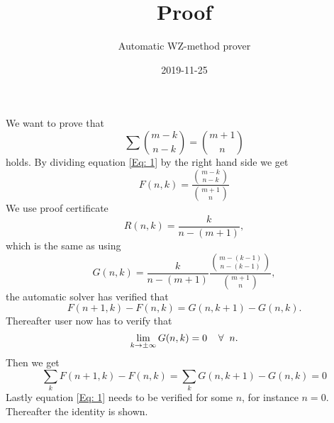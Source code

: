 \documentclass{article}
\title{Proof}
\author{Automatic WZ-method prover}
\date{2019-11-25}
\let\oldforall\forall
\renewcommand{\forall}{\hspace*{2mm}\oldforall\hspace*{1mm}}
\begin{document}
\maketitle
We want to prove that
\begin{equation}\label{Eq: 1}
\sum \binom{m-k}{n-k} = \binom{m+1}{n}
\end{equation}
holds. By dividing equation \ref{Eq: 1} by the right hand side we get
\begin{equation}
F(n,k)=\frac{\binom{m-k}{n-k}}{\binom{m+1}{n}}
\end{equation}
We use proof certificate
\begin{equation}
R(n,k)=\frac{k}{n-(m+1)},
\end{equation}
which is the same as using
\begin{equation}
G(n,k)=\frac{k}{n-(m+1)}\frac{\binom{m-(k-1)}{n-(k-1)}}{\binom{m+1}{n}},
\end{equation}
the automatic solver has  verified that
\begin{equation}\label{Eq: WZ1}
F(n+1,k)-F(n,k)=G(n,k+1)-G(n,k).
\end{equation}
Thereafter user now has to verify that
\begin{equation}
\lim_{k\to\pm\infty}G(n,k)=0\forall n.
\end{equation}
Then we get
\begin{equation}
\sum_k F(n+1,k)-F(n,k)=\sum_k G(n,k+1)-G(n,k)=0\end{equation}Lastly equation \ref{Eq: 1} needs to be verified for some $n$, for instance $n=0$. Thereafter the identity is shown.
\end{document}
